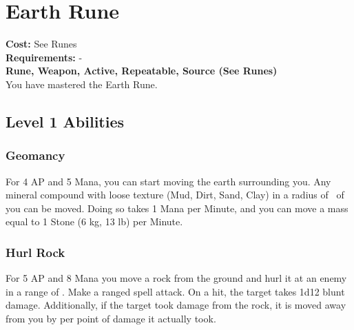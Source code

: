 \twocolumn
\section{Earth Rune}\label{rune:earth}
\textbf{Cost:} See Runes\\
\textbf{Requirements:} -\\
\textbf{Rune, Weapon, Active, Repeatable, Source (See Runes)}\\
You have mastered the Earth Rune.

\subsection{Level 1 Abilities}

\subsubsection{Geomancy}
For 4 AP and 5 Mana, you can start moving the earth surrounding you.
Any mineral compound with loose texture (Mud, Dirt, Sand, Clay) in a radius of~ of you can be moved.
Doing so takes 1 Mana per Minute, and you can move a mass equal to 1 Stone (6 kg, 13 lb) per Minute.

\subsubsection{Hurl Rock}
For 5 AP and 8 Mana you move a rock from the ground and hurl it at an enemy in a range of .
Make a ranged spell attack.
On a hit, the target takes 1d12 blunt damage.
Additionally, if the target took damage from the rock, it is moved away from you by  per point of damage it actually took.